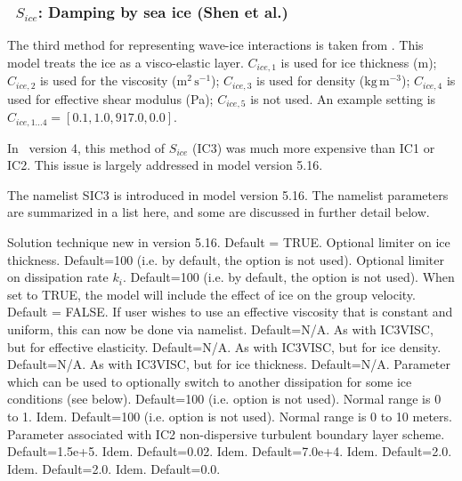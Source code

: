 \vsssub
\subsubsection{~$S_{ice}$: Damping by sea ice (Shen et al.)} \label{sec:ICE3}
\vsssub


\noindent
The third method for representing wave-ice interactions is taken from\linebreak
\cite{art:WS10}. This model treats the ice as a visco-elastic
layer. ${C_{ice,1}}$ is used for ice thickness (m); ${C_{ice,2}}$ is used for
the viscosity ($\mathrm{m^2\,s^{-1}}$); ${C_{ice,3}}$ is used for density
($\mathrm{kg\,m^{-3}}$); ${C_{ice,4}}$ is used for effective shear modulus
(Pa); ${C_{ice,5}}$ is not used. An example setting is 
${C_{ice,1...4}}=[0.1, 1.0, 917.0, 0.0]$.

In \ws\ version 4, this method of $S_{ice}$ ({\code IC3}) was much more expensive than {\code IC1} or {\code IC2}. This issue is largely addressed in model version 5.16.

The namelist {\F SIC3} is introduced in model version 5.16. The namelist parameters are summarized in a list here, and some are discussed in further detail below.

\begin{clist}
 {Solution technique new in version 5.16. Default = {\code TRUE}.}
 {Optional limiter on ice thickness. Default=100 (i.e. by default, the option is not used).}
 {Optional limiter on dissipation rate ${k_i}$. Default=100 (i.e. by default, the option is not used).}
 {When set to {\code TRUE}, the model will include the effect of ice on the group velocity. Default = {\code FALSE}.}
 {If user wishes to use an effective viscosity that is constant and uniform, this can now be done via namelist. Default=N/A.}
 {As with {\code IC3VISC}, but for effective elasticity. Default=N/A.}
 {As with {\code IC3VISC}, but for ice density. Default=N/A.}
 {As with {\code IC3VISC}, but for ice thickness. Default=N/A.}
 {Parameter which can be used to optionally switch to another dissipation for some ice conditions (see below). Default=100 (i.e. option is not used). Normal range is 0 to 1.}
 {Idem. Default=100 (i.e. option is not used). Normal range is 0 to 10 meters.}        
 {Parameter associated with IC2 non-dispersive turbulent boundary layer scheme. Default=1.5e+5.}
 {Idem. Default=0.02.}
 {Idem. Default=7.0e+4.}
 {Idem. Default=2.0.}
 {Idem. Default=2.0.}          
 {Idem. Default=0.0.}
\end{clist}

